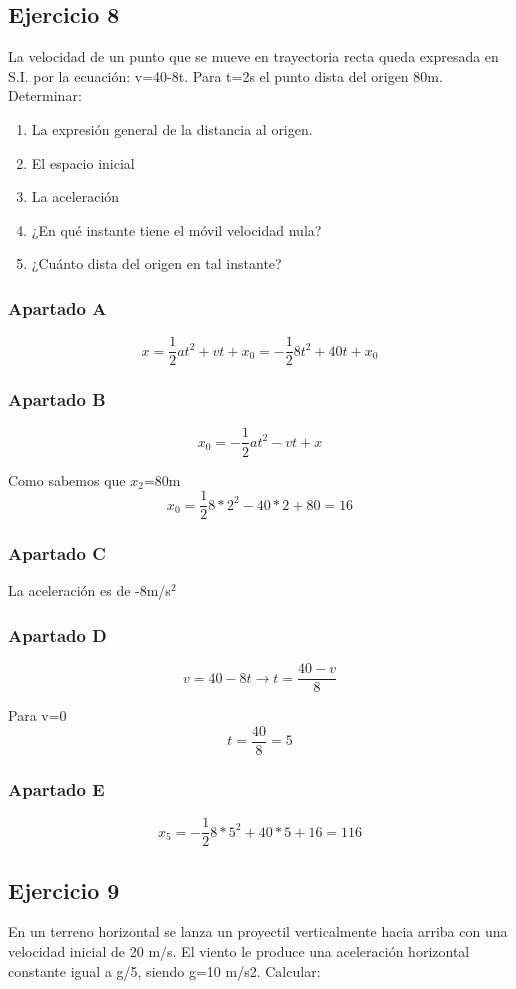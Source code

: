 \subsection{Ejercicio 8}
La velocidad de un punto que se mueve en trayectoria
recta queda expresada en S.I. por la ecuación: v=40-8t.
Para t=2s el punto dista del origen 80m. Determinar:

\begin{enumerate}[label=\Alph*)]
  \item La expresión general de la distancia al origen.
  \item El espacio inicial
  \item La aceleración
  \item ¿En qué instante tiene el móvil velocidad nula?
  \item ¿Cuánto dista del origen en tal instante?
\end{enumerate}

\subsubsection{Apartado A}
  $$
  x = \frac{1}{2}at^2 + vt + x_0
  = -\frac{1}{2}8t^2 + 40t + x_0
  $$

\subsubsection{Apartado B}
  $$
  x_0 = -\frac{1}{2}at^2 - vt + x
  $$
  
  Como sabemos que $x_2$=80m
  $$
  x_0 = \frac{1}{2}8*2^2 - 40*2 + 80 = 16
  $$

\subsubsection{Apartado C}
  La aceleración es de -8m/s$^2$

\subsubsection{Apartado D}
  $$
  v = 40 - 8t \rightarrow t = \frac{40-v}{8}
  $$

  Para v=0
  $$
  t = \frac{40}{8} = 5
  $$

\subsubsection{Apartado E}
  $$
  x_5 = -\frac{1}{2}8*5^2 + 40*5 +16 = 116
  $$

\subsection{Ejercicio 9}
En un terreno horizontal se lanza un proyectil
verticalmente hacia arriba con una velocidad inicial
de 20 m/s. El viento le produce una aceleración
horizontal constante igual a g/5, siendo g=10 m/s2.
Calcular:

